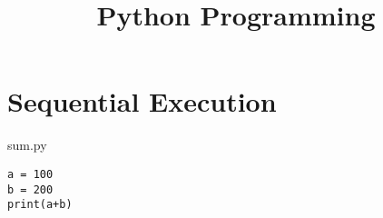 \documentclass[aspectratio=1610,t]{beamer}
\author{}
\title{Python Programming}
\begin{document}

\makeTitleSlide{}

\makeTableOfContents


\section{Sequential Execution}

\begin{pframe}
 \begin{center}
  
 \end{center}
\end{pframe}


\begin{pframe}
 \begin{minipage}{0.37\textwidth}
  \begin{center}
   
  \end{center}
 \end{minipage}%
 \begin{minipage}{0.57\textwidth}
  \begin{pythonfile}{sum.py}
   \begin{verbatim}
a = 100
b = 200
print(a+b)
   \end{verbatim}
  \end{pythonfile}
 \begin{terminal}
  \end{terminal}
 \end{minipage}
\end{pframe}
\end{document}
